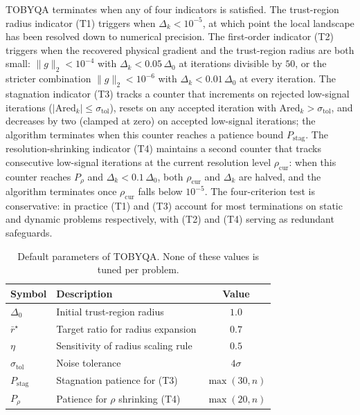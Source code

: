 \documentclass[11pt,a4paper]{article}
\begin{document}
TOBYQA terminates when any of four indicators is satisfied. The
trust-region radius indicator (T1) triggers when $\Delta_k < 10^{-5}$,
at which point the local landscape has been resolved down to
numerical precision. The first-order indicator (T2) triggers when
the recovered physical gradient and the trust-region radius are
both small: $\|g\|_2 < 10^{-4}$ with $\Delta_k < 0.05\,\Delta_0$
at iterations divisible by $50$, or the stricter combination
$\|g\|_2 < 10^{-6}$ with $\Delta_k < 0.01\,\Delta_0$ at every
iteration. The stagnation indicator (T3) tracks a counter that
increments on rejected low-signal iterations
($|\mathrm{Ared}_k| \le \sigma_{\mathrm{tol}}$), resets on any
accepted iteration with $\mathrm{Ared}_k > \sigma_{\mathrm{tol}}$,
and decreases by two (clamped at zero) on accepted low-signal
iterations; the algorithm terminates when this counter reaches
a patience bound $P_{\mathrm{stag}}$. The resolution-shrinking
indicator (T4) maintains a second counter that tracks consecutive
low-signal iterations at the current resolution level
$\rho_{\mathrm{cur}}$: when this counter reaches $P_{\rho}$ and
$\Delta_k < 0.1\,\Delta_0$, both $\rho_{\mathrm{cur}}$ and
$\Delta_k$ are halved, and the algorithm terminates once
$\rho_{\mathrm{cur}}$ falls below $10^{-5}$. The four-criterion
test is conservative: in practice (T1) and (T3) account for most
terminations on static and dynamic problems respectively, with
(T2) and (T4) serving as redundant safeguards.

\begin{table}[h]
\centering
\caption{Default parameters of TOBYQA. None of these values is tuned
per problem.}
\label{tab:defaults}
\begin{tabular}{llc}
\toprule
Symbol & Description & Value \\
\midrule
$\Delta_0$              & Initial trust-region radius           & $1.0$ \\
$\bar r^{\star}$        & Target ratio for radius expansion     & $0.7$ \\
$\eta$                  & Sensitivity of radius scaling rule    & $0.5$ \\
$\sigma_{\mathrm{tol}}$ & Noise tolerance                       & $4\sigma$ \\
$P_{\mathrm{stag}}$     & Stagnation patience for (T3)          & $\max(30, n)$ \\
$P_{\rho}$              & Patience for $\rho$ shrinking (T4)    & $\max(20, n)$ \\
\bottomrule
\end{tabular}
\end{table}
\end{document}
